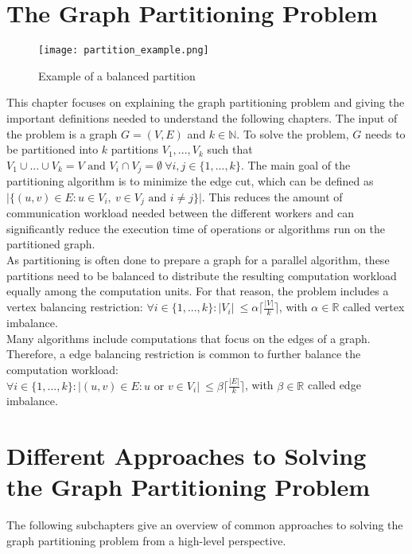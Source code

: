 \documentclass[acmsmall,nonacm,screen,review]{acmart}
\begin{document}
\section{The Graph Partitioning Problem}
\begin{figure}[t]
\centering
\caption{Example of a balanced partition}
\label{partition}
\texttt{[image: partition\_example.png]}
\end{figure}
This chapter focuses on explaining the graph partitioning problem and giving the important definitions needed to understand the following chapters. The input of the problem is a graph $G = (V,E)$ and $k\in \mathbb{N}$. To solve the problem, $G$ needs to be partitioned into $k$ partitions $V_{1},...,V_{k}$ such that $V_{1}\cup...\cup V_{k} = V \text{ and } V_{i}\cap V_{j} = \emptyset\ \forall i,j\in \{1,...,k\}$. The main goal of the partitioning algorithm is to minimize the edge cut, which can be defined as $\vert \{(u,v)\in E : u\in V_{i},\ v\in V_{j} \text{ and } i\neq j \}\vert$. This reduces the amount of communication workload needed between the different workers and can significantly reduce the execution time of operations or algorithms run on the partitioned graph. \\
As partitioning is often done to prepare a graph for a parallel algorithm, these partitions need to be balanced to distribute the resulting computation workload equally among the computation units. For that reason, the problem includes a vertex balancing restriction: $\forall i\in \{1,...,k\} : \vert V_{i}\vert \ \leq \alpha \lceil \frac{\vert V \vert }{k} \rceil $, with $\alpha \in \mathbb{R}$ called vertex imbalance. \\
Many algorithms include computations that focus on the edges of a graph. Therefore, a edge balancing restriction is common to further balance the computation workload: \\ $\forall i\in \{1,...,k\} : \vert (u,v)\in E : u \text{ or } v \in V_{i} \vert \ \leq \beta \lceil \frac{\vert E \vert }{k} \rceil $, with $\beta \in \mathbb{R}$ called edge imbalance.
\section{Different Approaches to Solving the Graph Partitioning Problem}
The following subchapters give an overview of common approaches to solving the graph partitioning problem from a high-level perspective.
\end{document}
